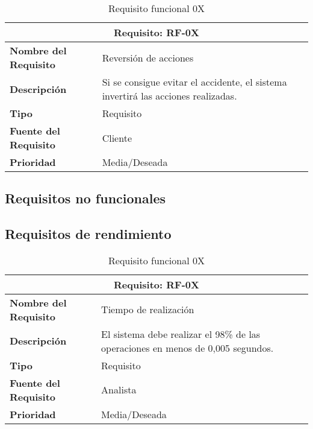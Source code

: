 \documentclass[10pt,a4paper,oldfontcommands]{dpds}
\begin{document}
\begin{table}[H]
\begin{center}
\begin{tabular}{p{} p{7cm}}
\multicolumn{2}{c}{\textbf{Requisito: RF-0X} } \\
\hline \hline
\textbf{Nombre del Requisito} & Reversión de acciones\\
\textbf{Descripción} &  Si se consigue evitar el accidente, el sistema invertirá las acciones realizadas.\\
\textbf{Tipo} & Requisito  \\
\textbf{Fuente del Requisito} & Cliente  \\
\textbf{Prioridad} & Media/Deseada \\ \hline
\end{tabular}
\caption{Requisito funcional 0X}
\label{tab:personal}
\end{center}
\end{table}


\subsection{Requisitos no funcionales}

\subsection{Requisitos de rendimiento}


\begin{table}[H]
\begin{center}
\begin{tabular}{p{} p{7cm}}
\multicolumn{2}{c}{\textbf{Requisito: RF-0X} } \\
\hline \hline
\textbf{Nombre del Requisito} & Tiempo de realización\\
\textbf{Descripción} &  El sistema debe realizar el 98\% de las operaciones en menos de 0,005 segundos.\\
\textbf{Tipo} & Requisito  \\
\textbf{Fuente del Requisito} & Analista  \\
\textbf{Prioridad} & Media/Deseada \\ \hline
\end{tabular}
\caption{Requisito funcional 0X}
\label{tab:personal}
\end{center}
\end{table}
\end{document}
